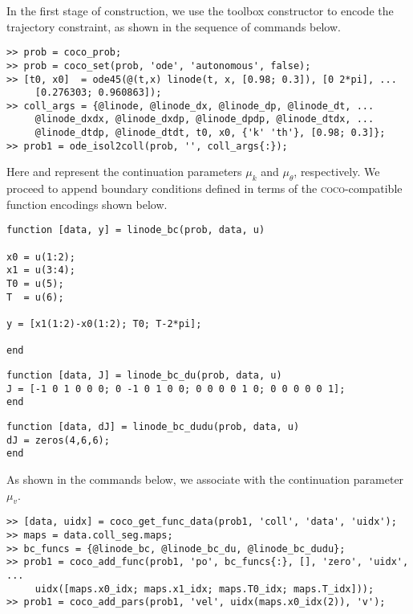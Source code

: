 In the first stage of construction, we use the  toolbox constructor to encode the trajectory constraint, as shown in the sequence of commands below.
\begin{lstlisting}[language=coco-highlight]
>> prob = coco_prob;
>> prob = coco_set(prob, 'ode', 'autonomous', false);
>> [t0, x0]  = ode45(@(t,x) linode(t, x, [0.98; 0.3]), [0 2*pi], ...
     [0.276303; 0.960863]);
>> coll_args = {@linode, @linode_dx, @linode_dp, @linode_dt, ...
     @linode_dxdx, @linode_dxdp, @linode_dpdp, @linode_dtdx, ...
     @linode_dtdp, @linode_dtdt, t0, x0, {'k' 'th'}, [0.98; 0.3]};
>> prob1 = ode_isol2coll(prob, '', coll_args{:});
\end{lstlisting}
Here  and  represent the continuation parameters $\mu_k$ and $\mu_\theta$, respectively. We proceed to append boundary conditions defined in terms of the \textsc{coco}-compatible function encodings shown below.
\begin{lstlisting}[language=coco-highlight]
function [data, y] = linode_bc(prob, data, u)

x0 = u(1:2);
x1 = u(3:4);
T0 = u(5);
T  = u(6);

y = [x1(1:2)-x0(1:2); T0; T-2*pi];

end
\end{lstlisting}
\begin{lstlisting}[language=coco-highlight]
function [data, J] = linode_bc_du(prob, data, u)
J = [-1 0 1 0 0 0; 0 -1 0 1 0 0; 0 0 0 0 1 0; 0 0 0 0 0 1];
end
\end{lstlisting}
\begin{lstlisting}[language=coco-highlight]
function [data, dJ] = linode_bc_dudu(prob, data, u)
dJ = zeros(4,6,6);
end
\end{lstlisting}
As shown in the commands below, we associate  with the continuation parameter $\mu_v$.
\begin{lstlisting}[language=coco-highlight]
>> [data, uidx] = coco_get_func_data(prob1, 'coll', 'data', 'uidx');
>> maps = data.coll_seg.maps;
>> bc_funcs = {@linode_bc, @linode_bc_du, @linode_bc_dudu};
>> prob1 = coco_add_func(prob1, 'po', bc_funcs{:}, [], 'zero', 'uidx', ...
     uidx([maps.x0_idx; maps.x1_idx; maps.T0_idx; maps.T_idx]));
>> prob1 = coco_add_pars(prob1, 'vel', uidx(maps.x0_idx(2)), 'v');
\end{lstlisting}

